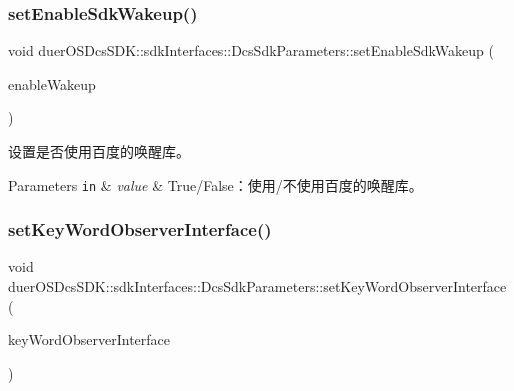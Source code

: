 \subsubsection{\texorpdfstring{set\+Enable\+Sdk\+Wakeup()}{setEnableSdkWakeup()}}
{\footnotesize\ttfamily void duer\+O\+S\+Dcs\+S\+D\+K\+::sdk\+Interfaces\+::\+Dcs\+Sdk\+Parameters\+::set\+Enable\+Sdk\+Wakeup (\begin{DoxyParamCaption}\item[{const bool}]{enable\+Wakeup }\end{DoxyParamCaption})\hspace{0.3cm}{\ttfamily [inline]}}



设置是否使用百度的唤醒库。 


\begin{DoxyParams}[1]{Parameters}
\mbox{\tt in}  & {\em value} & True/\+False：使用/不使用百度的唤醒库。 \\
\hline
\end{DoxyParams}
\mbox{\label{structduerOSDcsSDK_1_1sdkInterfaces_1_1DcsSdkParameters_a681260954fd2cd2d198eebe4dff45603}} 
\subsubsection{\texorpdfstring{set\+Key\+Word\+Observer\+Interface()}{setKeyWordObserverInterface()}}
{\footnotesize\ttfamily void duer\+O\+S\+Dcs\+S\+D\+K\+::sdk\+Interfaces\+::\+Dcs\+Sdk\+Parameters\+::set\+Key\+Word\+Observer\+Interface (\begin{DoxyParamCaption}\item[{std\+::shared\+\_\+ptr$<$ \hyperlink{classduerOSDcsSDK_1_1sdkInterfaces_1_1KeyWordObserverInterface}{sdk\+Interfaces\+::\+Key\+Word\+Observer\+Interface} $>$}]{key\+Word\+Observer\+Interface }\end{DoxyParamCaption})\hspace{0.3cm}{\ttfamily [inline]}}



